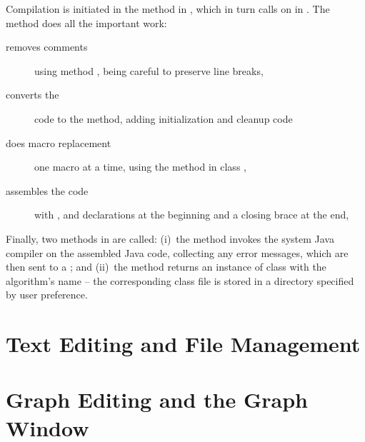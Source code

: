 Compilation is initiated in the  method in
, which in turn calls on  in
.
The method  does all the important work:
\begin{description}
\item[removes comments] using method , being careful
  to preserve line breaks,
\item[converts the ] code to the 
  method, adding initialization and cleanup code
\item[does macro replacement] one macro at a time, using the 
  method in class ,
\item[assembles the code] with ,  and 
  declarations at the beginning and a closing brace at the end,
\end{description}
Finally, two methods in  are called: (i)~the
 method invokes the system Java compiler on
the assembled Java code, collecting any error messages, which are then sent
to a ; and (ii)~the  method
returns an instance of class  with the algorithm's name --
the corresponding class file is stored in a directory specified by user
preference.


\section{Text Editing and File Management} \label{sec:editing}

\section{Graph Editing and the Graph Window} \label{sec:graph_window}

